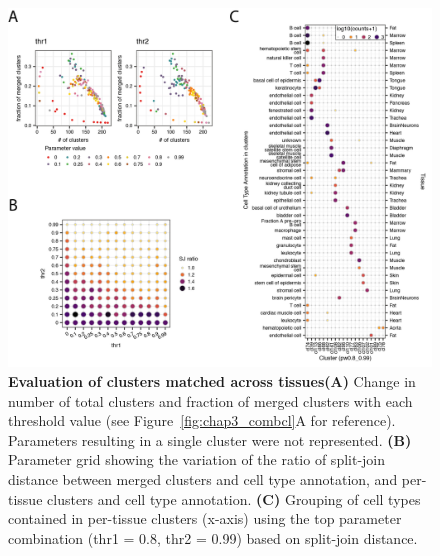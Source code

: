 \begin{figure}[hb!]
    \centering    
    \includegraphics[width=1.0\textwidth]{Chapter3/Figs/chap3_combineData.png} %
    \caption[Evaluation of clusters matched across tissues]{\textbf{Evaluation of clusters matched across tissues}\newline\textbf{(A)} Change in number of total clusters and fraction of merged clusters with each threshold value (see Figure~\ref{fig:chap3_combcl}A for reference). Parameters resulting in a single cluster were not represented. \textbf{(B)} Parameter grid showing the variation of the ratio of split-join distance between merged clusters and cell type annotation, and per-tissue clusters and cell type annotation. \textbf{(C)} Grouping of cell types contained in per-tissue clusters (x-axis) using the top parameter combination (thr1 = 0.8, thr2 = 0.99) based on split-join distance.}
    \label{fig:chap3_combdat}
\end{figure}

